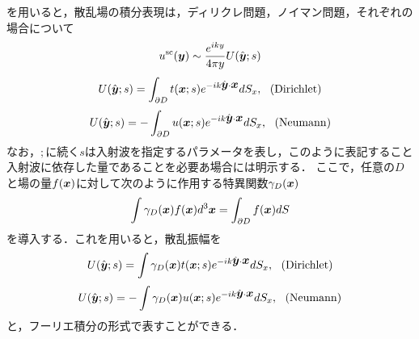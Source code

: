 を用いると，散乱場の積分表現は，ディリクレ問題，ノイマン問題，それぞれの場合について
\begin{equation}
	u^{\rm sc}(\mbox{\boldmath $y$}) \sim \frac{e^{iky}}{4\pi y} U(\hat{\mbox{\boldmath $y$}};s)  
	\label{eqn:}
\end{equation}
\begin{equation}
	U(\hat{\mbox{\boldmath $y$}};s)  = \int _{\partial D} t(\mbox{\boldmath $x$};s)e^{-ik\hat{\mbox{\boldmath $y$}}\cdot \mbox{\boldmath $x$}} dS_x
	, \ \ ( {\rm Dirichlet})
	\label{eqn:}
\end{equation}
\begin{equation}
	U(\hat{\mbox{\boldmath $y$}};s)  =-\int _{\partial D} u(\mbox{\boldmath $x$};s)e^{-ik\hat{\mbox{\boldmath $y$}}\cdot \mbox{\boldmath $x$}} dS_x
	, \ \ ({\rm Neumann})
	\label{eqn:}
\end{equation}
なお，$;$に続く$s$は入射波を指定するパラメータを表し，このように表記すること
入射波に依存した量であることを必要あ場合には明示する．
ここで，任意の$D$と場の量$f(\mbox{\boldmath $x$})$に対して次のように作用する特異関数$\gamma_D(\mbox{\boldmath $x$})$
\begin{equation}
	\int \gamma_D(\mbox{\boldmath $x$})f(\mbox{\boldmath $x$})d^3\mbox{\boldmath $x$} =\int _{\partial D} f(\mbox{\boldmath $x$}) dS
	\label{eqn:}
\end{equation}
を導入する．これを用いると，散乱振幅を
\begin{equation}
	U(\hat{\mbox{\boldmath $y$}};s)  = \int \gamma_D(\mbox{\boldmath $x$})t(\mbox{\boldmath $x$};s)e^{-ik\hat{\mbox{\boldmath $y$}}\cdot \mbox{\boldmath $x$}} dS_x
	, \ \ ( {\rm Dirichlet})
	\label{eqn:}
\end{equation}
\begin{equation}
	U(\hat{\mbox{\boldmath $y$}};s)  =-\int \gamma_D(\mbox{\boldmath $x$})u(\mbox{\boldmath $x$};s)e^{-ik\hat{\mbox{\boldmath $y$}}\cdot \mbox{\boldmath $x$}} dS_x
	, \ \ ({\rm Neumann})
	\label{eqn:}
\end{equation}
と，フーリエ積分の形式で表すことができる．


